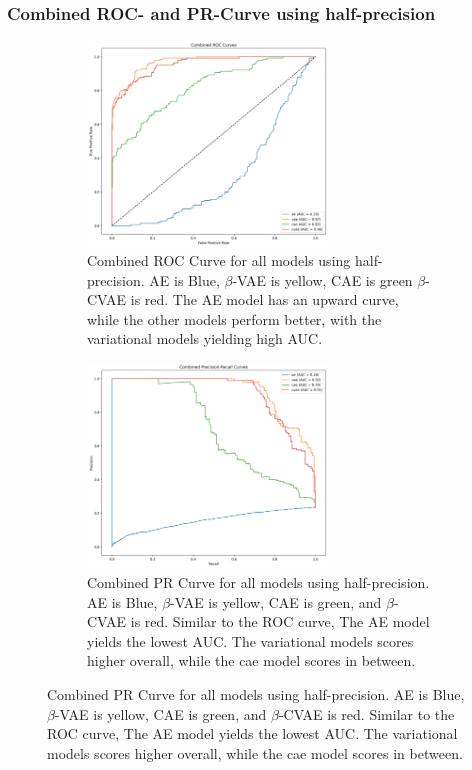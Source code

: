 \subsubsection{Combined ROC- and PR-Curve using half-precision}
\begin{figure}[!htbp]
    \centering
    \begin{subfigure}[b]{\textwidth}
        \centering
        \includegraphics[width=0.7\textwidth]{figures/anomalies/combined_roc_curve.png}
        \caption{Combined ROC Curve for all models using half-precision. AE is Blue, $\beta$-VAE is yellow, CAE is green $\beta$-CVAE is red. The AE model has an upward curve, while the other models perform better, with the variational models yielding high AUC.}
        \label{fig:roccurve}
    \end{subfigure}
    \vspace{1em}
    \begin{subfigure}[b]{\textwidth}
        \centering
        \includegraphics[width=0.7\textwidth]{figures/anomalies/combined_pr_curve.png}
        \caption{Combined PR Curve for all models using half-precision. AE is Blue, $\beta$-VAE is yellow, CAE is green, and $\beta$-CVAE is red. Similar to the ROC curve, The AE model yields the lowest AUC. The variational models scores higher overall, while the \acrshort{cae} model scores in between.}
        \label{fig:prcurve}
    \end{subfigure}
    \label{fig:combined_curves}
\end{figure}
\clearpage


